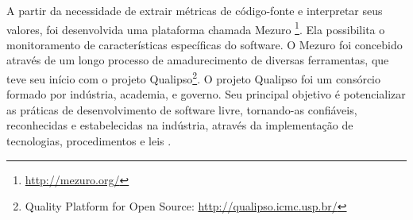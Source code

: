 A partir da necessidade de extrair métricas de código-fonte e interpretar seus valores, foi desenvolvida uma plataforma chamada Mezuro \footnote{\url{http://mezuro.org/}}. Ela possibilita o monitoramento de características específicas do software. O Mezuro foi concebido através de um longo processo de amadurecimento de diversas ferramentas, que teve seu início com o projeto Qualipso\footnote{Quality Platform for Open Source: \url{http://qualipso.icmc.usp.br/}}.
O projeto Qualipso foi um consórcio formado por indústria, academia, e governo. Seu principal objetivo é potencializar as práticas de desenvolvimento de software livre, tornando-as confiáveis, reconhecidas e estabelecidas na indústria, através da implementação de tecnologias, procedimentos e leis \cite{qualipso2009}. 
	



